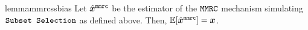 \begin{restatable}{lemma}{mmrcssbias}\label{lemma:mmrc_ss_bias}
Let $\hat{{\boldsymbol{x}}}^\texttt{mmrc}$ be the estimator of the \emph{$\texttt{MMRC}$} mechanism simulating \emph{$\texttt{Subset Selection}$} as defined above. Then, $\mathbb{E}[\hat{{\boldsymbol{x}}}^\texttt{mmrc}] = {\boldsymbol{x}}$.
\end{restatable}

